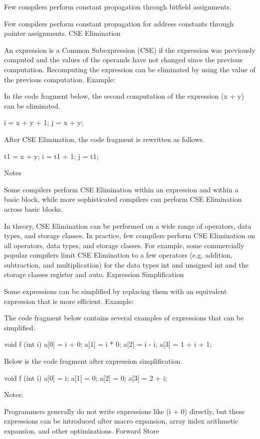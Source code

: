{{{{{{{{{{Few compilers perform constant propagation through bitfield assignments.

Few compilers perform constant propagation for address constants through pointer assignments. 
CSE Elimination

An expression is a Common Subexpression (CSE) if the expression was previously computed and the values of the operands have not changed since the previous computation. Recomputing the expression can be eliminated by using the value of the previous computation.
Example:

In the code fragment below, the second computation of the expression (x + y) can be eliminated.

    	i = x + y + 1;
    	j = x + y;

After CSE Elimination, the code fragment is rewritten as follows.

    	t1 = x + y;
    	i = t1 + 1;
    	j = t1;

Notes

Some compilers perform CSE Elimination within an expression and within a basic block, while more sophisticated compilers can perform CSE Elimination across basic blocks.

In theory, CSE Elimination can be performed on a wide range of operators, data types, and storage classes. In practice, few compilers perform CSE Elimination on all operators, data types, and storage classes. For example, some commercially popular compilers limit CSE Elimination to a few operators (e.g. addition, subtraction, and multiplication) for the data types int and unsigned int and the storage classes register and auto. 
Expression Simplification

Some expressions can be simplified by replacing them with an equivalent expression that is more efficient.
Example:

The code fragment below contains several examples of expressions that can be simplified.

    void f (int i)
    {
      a[0] = i + 0;
      a[1] = i * 0;
      a[2] = i - i;
      a[3] = 1 + i + 1;
    }

Below is the code fragment after expression simplification.

    void f (int i)
    {
      a[0] = i;
      a[1] = 0;
      a[2] = 0;
      a[3] = 2 + i;
    }

Notes:

Programmers generally do not write expressions like (i + 0) directly, but these expressions can be introduced after macro expansion, array index arithmetic expansion, and other optimizations. 
Forward Store

}}}}}}}}}}
